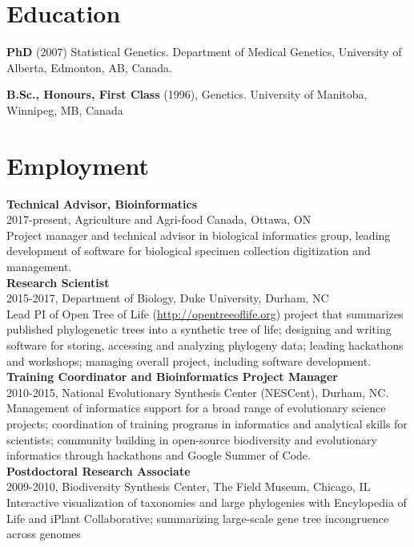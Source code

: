\documentclass[10pt]{article}
\begin{document}
\section*{Education}
{\bf PhD} (2007) Statistical Genetics. Department of Medical Genetics, University of Alberta, Edmonton, AB, Canada. 

{\bf B.Sc., Honours, First Class} (1996), Genetics. University of Manitoba, Winnipeg, MB, Canada \\

\section*{Employment}

\noindent \textbf{Technical Advisor, Bioinformatics} \\
2017-present, Agriculture and Agri-food Canada, Ottawa, ON \\
Project manager and technical advisor in biological informatics group, leading development of software for biological specimen collection digitization and management.\\

\noindent \textbf{Research Scientist} \\
2015-2017, Department of Biology, Duke University, Durham, NC \\
Lead PI of Open Tree of Life (\url{http://opentreeoflife.org}) project that summarizes published phylogenetic trees into a synthetic tree of life; designing and writing software for storing, accessing and analyzing phylogeny data; leading hackathons and workshops; managing overall project, including software development. \\

\noindent \textbf{Training Coordinator and Bioinformatics Project Manager} \\
2010-2015, National Evolutionary Synthesis Center (NESCent), Durham, NC. \\
Management of informatics support for a broad range of evolutionary science projects; coordination of training programs in informatics and analytical skills for scientists; community building in open-source biodiversity and evolutionary informatics through hackathons and Google Summer of Code. \\

\noindent \textbf{Postdoctoral Research Associate} \\
2009-2010, Biodiversity Synthesis Center, The Field Museum, Chicago, IL  \\
Interactive visualization of taxonomies and large phylogenies with Encylopedia of Life and iPlant Collaborative; summarizing large-scale gene tree incongruence across genomes \\
\end{document}
